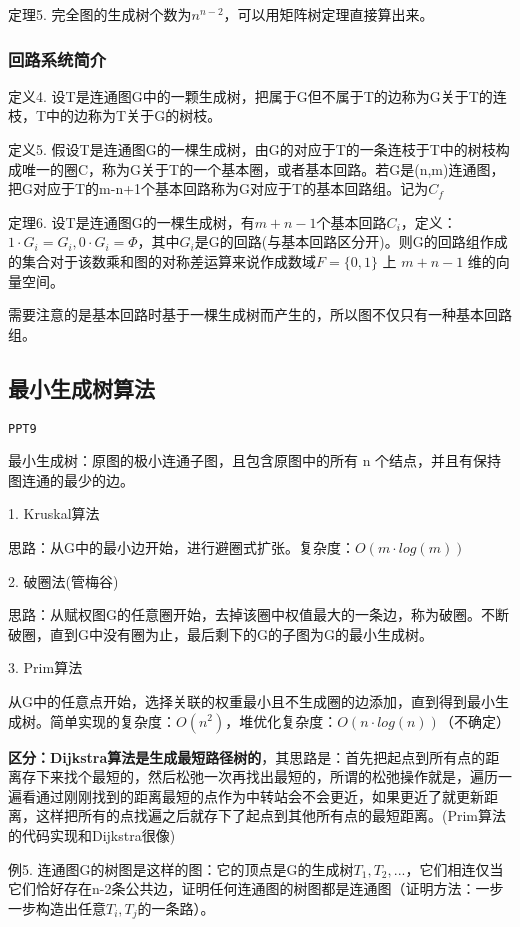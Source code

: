 \documentclass{article}
\begin{document}
定理5. 完全图的生成树个数为$n^{n-2}$，可以用矩阵树定理直接算出来。

\subsubsection{回路系统简介}

定义4. 设T是连通图G中的一颗生成树，把属于G但不属于T的边称为G关于T的连枝，T中的边称为T关于G的树枝。

定义5. 假设T是连通图G的一棵生成树，由G的对应于T的一条连枝于T中的树枝构成唯一的圈C，称为G关于T的一个基本圈，或者基本回路。若G是(n,m)连通图，把G对应于T的m-n+1个基本回路称为G对应于T的基本回路组。记为$C_f$

定理6. 设T是连通图G的一棵生成树，有$m+n-1$个基本回路$C_i$，定义：$1\cdot G_i = G_i, 0\cdot G_i = \Phi$，其中$G_i$是G的回路(与基本回路区分开)。则G的回路组作成的集合对于该数乘和图的对称差运算来说作成数域$F = \{0,1\}$ 上 $m+n-1$ 维的向量空间。

需要注意的是基本回路时基于一棵生成树而产生的，所以图不仅只有一种基本回路组。

\subsection{最小生成树算法}

\texttt{PPT9}

最小生成树：原图的极小连通子图，且包含原图中的所有 n  个结点，并且有保持图连通的最少的边。

1. Kruskal算法

思路：从G中的最小边开始，进行避圈式扩张。复杂度：$O(m \cdot log(m))$

2. 破圈法(管梅谷)

思路：从赋权图G的任意圈开始，去掉该圈中权值最大的一条边，称为破圈。不断破圈，直到G中没有圈为止，最后剩下的G的子图为G的最小生成树。

3. Prim算法

从G中的任意点开始，选择关联的权重最小且不生成圈的边添加，直到得到最小生成树。简单实现的复杂度：$O(n^2)$，堆优化复杂度：$O(n \cdot log(n))$（不确定）

\textbf{区分：Dijkstra算法是生成最短路径树的}，其思路是：首先把起点到所有点的距离存下来找个最短的，然后松弛一次再找出最短的，所谓的松弛操作就是，遍历一遍看通过刚刚找到的距离最短的点作为中转站会不会更近，如果更近了就更新距离，这样把所有的点找遍之后就存下了起点到其他所有点的最短距离。(Prim算法的代码实现和Dijkstra很像)

例5. 连通图G的树图是这样的图：它的顶点是G的生成树$T_1,T_2,...$，它们相连仅当它们恰好存在n-2条公共边，证明任何连通图的树图都是连通图（证明方法：一步一步构造出任意$T_i, T_j$的一条路）。
\end{document}
